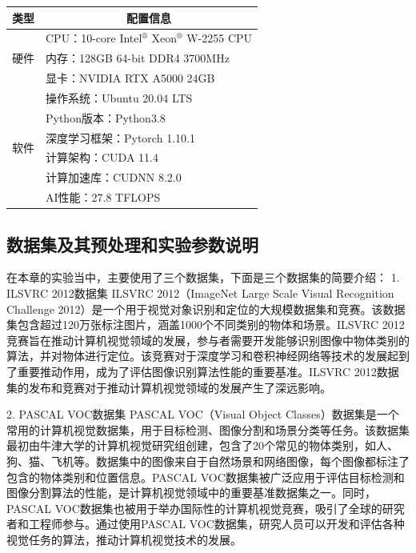\begin{table}
	\renewcommand{\arraystretch}{1.5}
\centering
{}
\label{tab:en}
	\begin{tabular}{p{4cm}p{8cm}} 
\toprule[1.5pt]
类型                  & \multicolumn{1}{c}{配置信息}      \\ 
\hline
\multirow{3}{*}{硬件} & CPU：10-core Intel$^\circledR$ Xeon$^\circledR$ W-2255 CPU                  \\
& 内存：128GB 64-bit DDR4 3700MHz  \\
& 显卡：NVIDIA RTX A5000 24GB      \\ 
\hline
\multirow{6}{*}{软件} & 操作系统：Ubuntu 20.04 LTS         \\
& Python版本：Python3.8            \\
& 深度学习框架：Pytorch 1.10.1         \\
& 计算架构：CUDA 11.4                \\
& 计算加速库：CUDNN 8.2.0             \\
& AI性能：27.8 TFLOPS              \\
\bottomrule[1.5pt]
\end{tabular}
\end{table}


\subsection{数据集及其预处理和实验参数说明}
在本章的实验当中，主要使用了三个数据集，下面是三个数据集的简要介绍：
1. ILSVRC 2012数据集
ILSVRC 2012（ImageNet Large Scale Visual Recognition Challenge 2012）是一个用于视觉对象识别和定位的大规模数据集和竞赛。该数据集包含超过120万张标注图片，涵盖1000个不同类别的物体和场景。ILSVRC 2012竞赛旨在推动计算机视觉领域的发展，参与者需要开发能够识别图像中物体类别的算法，并对物体进行定位。该竞赛对于深度学习和卷积神经网络等技术的发展起到了重要推动作用，成为了评估图像识别算法性能的重要基准。ILSVRC 2012数据集的发布和竞赛对于推动计算机视觉领域的发展产生了深远影响。

2. PASCAL VOC数据集
PASCAL VOC（Visual Object Classes）数据集是一个常用的计算机视觉数据集，用于目标检测、图像分割和场景分类等任务。该数据集最初由牛津大学的计算机视觉研究组创建，包含了20个常见的物体类别，如人、狗、猫、飞机等。数据集中的图像来自于自然场景和网络图像，每个图像都标注了包含的物体类别和位置信息。PASCAL VOC数据集被广泛应用于评估目标检测和图像分割算法的性能，是计算机视觉领域中的重要基准数据集之一。同时，PASCAL VOC数据集也被用于举办国际性的计算机视觉竞赛，吸引了全球的研究者和工程师参与。通过使用PASCAL VOC数据集，研究人员可以开发和评估各种视觉任务的算法，推动计算机视觉技术的发展。

